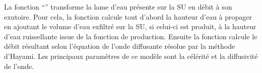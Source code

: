 La fonction ``\frenchname'' transforme la lame d'eau présente sur la SU en débit à son exutoire. Pour cela, la fonction calcule tout d'abord la hauteur d'eau à propager en ajoutant le volume d'eau exfiltré sur la SU, si celui-ci est produit, à la hauteur d'eau ruissellante issue de la fonction de production. Ensuite la fonction calcule le débit résultant selon l'équation de l'onde diffusante résolue par la méthode d'Hayami. Les principaux paramètres de ce modèle sont la célérité et la diffusivité de l'onde.